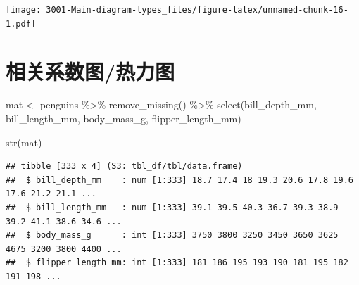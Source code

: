 \documentclass[
]{book}
\newenvironment{Shaded}{\begin{snugshade}}{\end{snugshade}}
\newcommand{\FunctionTok}[1]{\textcolor[rgb]{0.00,0.00,0.00}{#1}}
\newcommand{\NormalTok}[1]{#1}
\newcommand{\OtherTok}[1]{\textcolor[rgb]{0.56,0.35,0.01}{#1}}
\newcommand{\SpecialCharTok}[1]{\textcolor[rgb]{0.00,0.00,0.00}{#1}}
\begin{document}
\texttt{[image: 3001-Main-diagram-types\_files/figure-latex/unnamed-chunk-16-1.pdf]}

\hypertarget{ux76f8ux5173ux7cfbux6570ux56feux70edux529bux56fe}{%
\section{相关系数图/热力图}\label{ux76f8ux5173ux7cfbux6570ux56feux70edux529bux56fe}}

\begin{Shaded}
\begin{Highlighting}[]
\NormalTok{mat }\OtherTok{\textless{}{-}}\NormalTok{ penguins }\SpecialCharTok{\%\textgreater{}\%}
  \FunctionTok{remove\_missing}\NormalTok{() }\SpecialCharTok{\%\textgreater{}\%}
  \FunctionTok{select}\NormalTok{(bill\_depth\_mm, bill\_length\_mm, body\_mass\_g, flipper\_length\_mm)}

\FunctionTok{str}\NormalTok{(mat)}
\end{Highlighting}
\end{Shaded}

\begin{verbatim}
## tibble [333 x 4] (S3: tbl_df/tbl/data.frame)
##  $ bill_depth_mm    : num [1:333] 18.7 17.4 18 19.3 20.6 17.8 19.6 17.6 21.2 21.1 ...
##  $ bill_length_mm   : num [1:333] 39.1 39.5 40.3 36.7 39.3 38.9 39.2 41.1 38.6 34.6 ...
##  $ body_mass_g      : int [1:333] 3750 3800 3250 3450 3650 3625 4675 3200 3800 4400 ...
##  $ flipper_length_mm: int [1:333] 181 186 195 193 190 181 195 182 191 198 ...
\end{verbatim}
\end{document}

